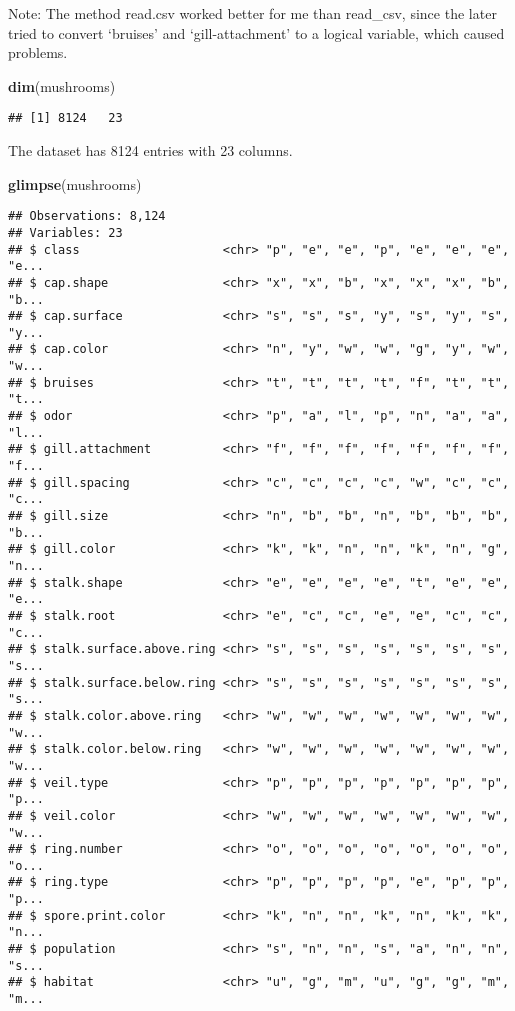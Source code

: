 \documentclass[]{article}
\newenvironment{Shaded}{\begin{snugshade}}{\end{snugshade}}
\newcommand{\KeywordTok}[1]{\textcolor[rgb]{0.13,0.29,0.53}{\textbf{#1}}}
\newcommand{\NormalTok}[1]{#1}
\begin{document}
Note: The method read.csv worked better for me than read\_csv, since the
later tried to convert `bruises' and `gill-attachment' to a logical
variable, which caused problems.

\begin{Shaded}
\begin{Highlighting}[]
\KeywordTok{dim}\NormalTok{(mushrooms)}
\end{Highlighting}
\end{Shaded}

\begin{verbatim}
## [1] 8124   23
\end{verbatim}

The dataset has 8124 entries with 23 columns.

\begin{Shaded}
\begin{Highlighting}[]
\KeywordTok{glimpse}\NormalTok{(mushrooms)}
\end{Highlighting}
\end{Shaded}

\begin{verbatim}
## Observations: 8,124
## Variables: 23
## $ class                    <chr> "p", "e", "e", "p", "e", "e", "e", "e...
## $ cap.shape                <chr> "x", "x", "b", "x", "x", "x", "b", "b...
## $ cap.surface              <chr> "s", "s", "s", "y", "s", "y", "s", "y...
## $ cap.color                <chr> "n", "y", "w", "w", "g", "y", "w", "w...
## $ bruises                  <chr> "t", "t", "t", "t", "f", "t", "t", "t...
## $ odor                     <chr> "p", "a", "l", "p", "n", "a", "a", "l...
## $ gill.attachment          <chr> "f", "f", "f", "f", "f", "f", "f", "f...
## $ gill.spacing             <chr> "c", "c", "c", "c", "w", "c", "c", "c...
## $ gill.size                <chr> "n", "b", "b", "n", "b", "b", "b", "b...
## $ gill.color               <chr> "k", "k", "n", "n", "k", "n", "g", "n...
## $ stalk.shape              <chr> "e", "e", "e", "e", "t", "e", "e", "e...
## $ stalk.root               <chr> "e", "c", "c", "e", "e", "c", "c", "c...
## $ stalk.surface.above.ring <chr> "s", "s", "s", "s", "s", "s", "s", "s...
## $ stalk.surface.below.ring <chr> "s", "s", "s", "s", "s", "s", "s", "s...
## $ stalk.color.above.ring   <chr> "w", "w", "w", "w", "w", "w", "w", "w...
## $ stalk.color.below.ring   <chr> "w", "w", "w", "w", "w", "w", "w", "w...
## $ veil.type                <chr> "p", "p", "p", "p", "p", "p", "p", "p...
## $ veil.color               <chr> "w", "w", "w", "w", "w", "w", "w", "w...
## $ ring.number              <chr> "o", "o", "o", "o", "o", "o", "o", "o...
## $ ring.type                <chr> "p", "p", "p", "p", "e", "p", "p", "p...
## $ spore.print.color        <chr> "k", "n", "n", "k", "n", "k", "k", "n...
## $ population               <chr> "s", "n", "n", "s", "a", "n", "n", "s...
## $ habitat                  <chr> "u", "g", "m", "u", "g", "g", "m", "m...
\end{verbatim}
\end{document}
